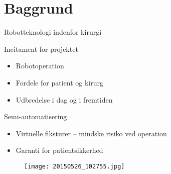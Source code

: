 \section{Baggrund}
\begin{frame}{Robotteknologi indenfor kirurgi}{}
\begin{minipage}[b]{0.55\linewidth}
\begin{block}{Incitament for projektet}
	\begin{itemize}
		\item Robotoperation
		\item Fordele for patient og kirurg
		\item Udbredelse i dag og i fremtiden
	\end{itemize}
\end{block}
\vspace{3mm}
\begin{block}{Semi-automatisering}
	\begin{itemize}
		\item Virtuelle fiksturer -- mindske risiko ved operation
		\item Garanti for patientsikkerhed
	\end{itemize}
\end{block}
\end{minipage}
	\hspace{0.1cm}
\begin{minipage}[b]{0.4\linewidth}
\begin{figure}[h]
\vspace{5mm}
\centering
\texttt{[image: 20150526\_102755.jpg]}
\end{figure}
\end{minipage}
\vspace{1cm}
\end{frame}

